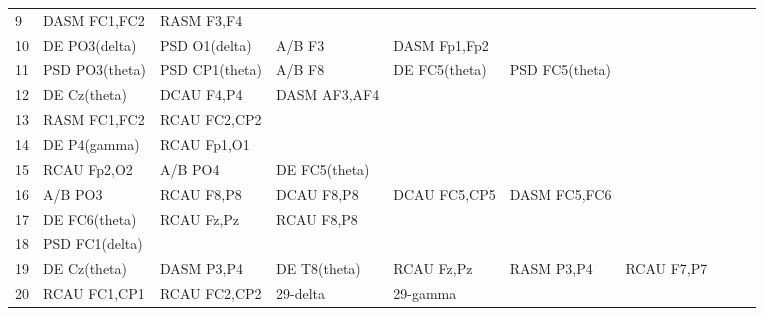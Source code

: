 \begin{landscape}
\begin{table}[]
\begin{tabular}{l|llllllll}
9        & DASM FC1,FC2   & RASM F3,F4     &                &                &                &                &               &                &               &               \\
10       & DE PO3(delta)  & PSD O1(delta)  & A/B F3         & DASM Fp1,Fp2   &                &                &               &                &               &               \\
11       & PSD PO3(theta) & PSD CP1(theta) & A/B F8         & DE FC5(theta)  & PSD FC5(theta) &                &               &                &               &               \\
12       & DE Cz(theta)   & DCAU F4,P4     & DASM AF3,AF4   &                &                &                &               &                &               &               \\
13       & RASM FC1,FC2   & RCAU FC2,CP2   &                &                &                &                &               &                &               &               \\
14       & DE P4(gamma)   & RCAU Fp1,O1    &                &                &                &                &               &                &               &               \\
15       & RCAU Fp2,O2    & A/B PO4        & DE FC5(theta)  &                &                &                &               &                &               &               \\
16       & A/B PO3        & RCAU F8,P8     & DCAU F8,P8     & DCAU FC5,CP5   & DASM FC5,FC6   &                &               &                &               &               \\
17       & DE FC6(theta)  & RCAU Fz,Pz     & RCAU F8,P8     &                &                &                &               &                &               &               \\
18       & PSD FC1(delta) &                &                &                &                &                &               &                &               &               \\
19       & DE Cz(theta)   & DASM P3,P4     & DE T8(theta)   & RCAU Fz,Pz     & RASM P3,P4     & RCAU F7,P7     &               &                &               &               \\
20       & RCAU FC1,CP1   & RCAU FC2,CP2   & 29-delta       & 29-gamma       &                &                &               &                &               &               \\

\end{tabular}
\end{table}
\end{landscape}
